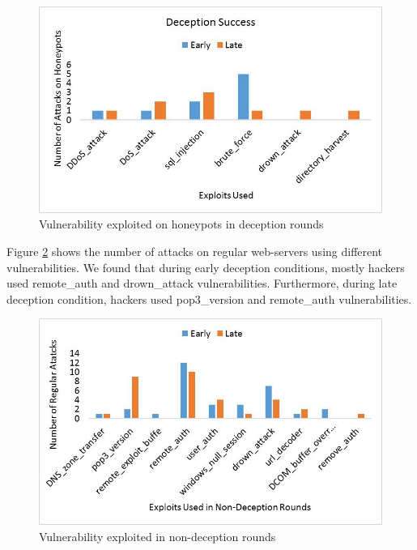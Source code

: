 \FloatBarrier
\begin{figure}[!htbp]
\centering
  \includegraphics[scale=0.6]{Chap3/success.jpg}
  \caption{Vulnerability exploited on honeypots in deception rounds}\label{fig:figure10}
\end{figure} 
Figure \ref{fig:figure12} shows the number of attacks on regular web-servers using different vulnerabilities. We found that during early deception conditions, mostly hackers used remote\_auth and drown\_attack vulnerabilities. Furthermore, during late deception condition, hackers used pop3\_version and remote\_auth vulnerabilities.
\FloatBarrier
\begin{figure}[!htbp]
\centering
  \includegraphics[scale=0.6]{Chap3/non-deception.jpg}
  \caption{Vulnerability exploited in non-deception rounds}\label{fig:figure12}
\end{figure} 
\clearpage 
